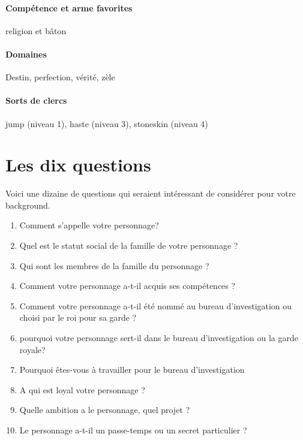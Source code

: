 \documentclass[10pt,a4paper]{book}
\begin{document}
\paragraph{Compétence et arme favorites}religion et bâton
\paragraph{Domaines}Destin, perfection, vérité, zèle
\paragraph{Sorts de clercs}jump (niveau 1), haste (niveau 3), stoneskin (niveau 4)
\section{Les dix questions}
Voici une dizaine de questions qui seraient intéressant de considérer pour votre background.
\begin{enumerate}
\item Comment s'appelle votre personnage?
\item Quel est le statut social de la famille de votre personnage ?
\item Qui sont les membres de la famille du personnage ?
\item Comment votre personnage a-t-il acquis ses compétences ?
\item Comment votre personnage a-t-il été nommé au bureau d'investigation ou choisi par le roi pour sa garde ?
\item pourquoi votre personnage sert-il dans le bureau d'investigation ou la garde royale?
\item Pourquoi êtes-vous à travailler pour le bureau d'investigation
\item A qui est loyal votre personnage ?
\item Quelle ambition a le personnage, quel projet ?
\item Le personnage a-t-il un passe-temps ou un secret particulier ?
\end{enumerate}
\end{document}
